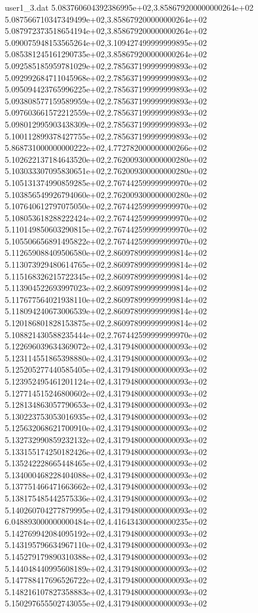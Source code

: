\begin{filecontents}{user1_3.dat}
5.083760604392386995e+02,3.858679200000000264e+02
5.087566710347349499e+02,3.858679200000000264e+02
5.087972373518654194e+02,3.858679200000000264e+02
5.090075948153565264e+02,3.109427499999999895e+02
5.085381245161290735e+02,3.858679200000000264e+02
5.092585185959781029e+02,2.785637199999999893e+02
5.092992684711045968e+02,2.785637199999999893e+02
5.095094423765996225e+02,2.785637199999999893e+02
5.093808577159589959e+02,2.785637199999999893e+02
5.097603661572212559e+02,2.785637199999999893e+02
5.098012995903438309e+02,2.785637199999999893e+02
5.100112899378427755e+02,2.785637199999999893e+02
5.868731000000000222e+02,4.772782000000000266e+02
5.102622137184643520e+02,2.762009300000000280e+02
5.103033307095830651e+02,2.762009300000000280e+02
5.105131374990859285e+02,2.767442599999999970e+02
5.103856549926794060e+02,2.762009300000000280e+02
5.107640612797075050e+02,2.767442599999999970e+02
5.108053618288222424e+02,2.767442599999999970e+02
5.110149850603290815e+02,2.767442599999999970e+02
5.105506656891495822e+02,2.767442599999999970e+02
5.112659088409506580e+02,2.860978999999999814e+02
5.113073929480614765e+02,2.860978999999999814e+02
5.115168326215722345e+02,2.860978999999999814e+02
5.113904522693997023e+02,2.860978999999999814e+02
5.117677564021938110e+02,2.860978999999999814e+02
5.118094240673006539e+02,2.860978999999999814e+02
5.120186801828153875e+02,2.860978999999999814e+02
5.108821430588235444e+02,2.767442599999999970e+02
5.122696039634369072e+02,4.317948000000000093e+02
5.123114551865398880e+02,4.317948000000000093e+02
5.125205277440585405e+02,4.317948000000000093e+02
5.123952495461201124e+02,4.317948000000000093e+02
5.127714515246800602e+02,4.317948000000000093e+02
5.128134863057790653e+02,4.317948000000000093e+02
5.130223753053016935e+02,4.317948000000000093e+02
5.125632068621700910e+02,4.317948000000000093e+02
5.132732990859232132e+02,4.317948000000000093e+02
5.133155174250182426e+02,4.317948000000000093e+02
5.135242228665448465e+02,4.317948000000000093e+02
5.134000468228404088e+02,4.317948000000000093e+02
5.137751466471663662e+02,4.317948000000000093e+02
5.138175485442575336e+02,4.317948000000000093e+02
5.140260704277879995e+02,4.317948000000000093e+02
6.048893000000000484e+02,4.416434300000000235e+02
5.142769942084095192e+02,4.317948000000000093e+02
5.143195796634967110e+02,4.317948000000000093e+02
5.145279179890310388e+02,4.317948000000000093e+02
5.144048440995608189e+02,4.317948000000000093e+02
5.147788417696526722e+02,4.317948000000000093e+02
5.148216107827358883e+02,4.317948000000000093e+02
5.150297655502743055e+02,4.317948000000000093e+02

\end{filecontents}
